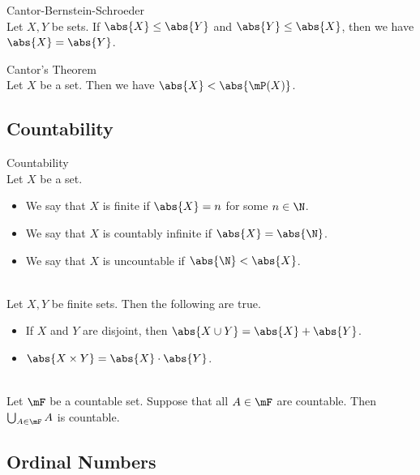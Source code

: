 \documentclass[a4paper]{article}
\begin{document}
\begin{thm}{Cantor-Bernstein-Schroeder}{}\\
Let $X,Y$ be sets. If $\abs{X}\leq\abs{Y}$ and $\abs{Y}\leq\abs{X}$, then we have $\abs{X}=\abs{Y}$. 
\end{thm}

\begin{thm}{Cantor's Theorem}{}\\
Let $X$ be a set. Then we have $\abs{X}<\abs{\mP(X)}$. 
\end{thm}

\subsection{Countability}
\begin{defn}{Countability}{}\\
Let $X$ be a set. 
\begin{itemize}
\item We say that $X$ is finite if $\abs{X}=n$ for some $n\in\N$. 
\item We say that $X$ is countably infinite if $\abs{X}=\abs{\N}$. 
\item We say that $X$ is uncountable if $\abs{\N}<\abs{X}$. 
\end{itemize}
\end{defn}

\begin{prp}{}{}\\
Let $X,Y$ be finite sets. Then the following are true. 
\begin{itemize}
\item If $X$ and $Y$ are disjoint, then $\abs{X\cup Y}=\abs{X}+\abs{Y}$. 
\item $\abs{X\times Y}=\abs{X}\cdot\abs{Y}$. 
\end{itemize}
\end{prp}

\begin{prp}{}{}\\
Let $\mF$ be a countable set. Suppose that all $A\in\mF$ are countable. Then $\bigcup_{A\in\mF}A$ is countable. 
\end{prp}

\subsection{Ordinal Numbers}
\end{document}
